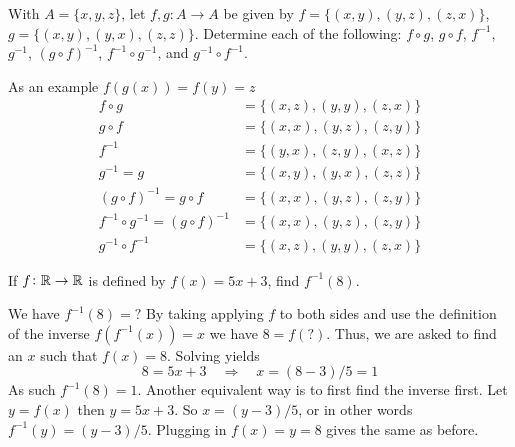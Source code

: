 \documentclass[a4paper, english, 12pt]{article} %
\begin{document}
\newpageanswer

\begin{problem}[27]
  With $A = \{x, y, z\}$, let $f, g \colon A \to A$ be given by $f = \{(x,y),
  (y,z), (z,x)\}$, $g = \{(x, y), (y, x), (z, z)\}$. Determine each of the
  following: $f \circ g$, $g \circ f$, $f^{-1}$, $g^{-1}$, $(g \circ f)^{-1}$,
  $f^{-1}\circ g^{-1}$, and $g^{-1} \circ f^{-1}$.
\end{problem}

\begin{answer}
  As an example $f(g(x)) = f(y) = z$
  \begin{align*}
    f \circ g & = \{ (x,z), (y, y), (z, x) \} \\
    g \circ f & = \{ (x,x), (y,z), (z,y) \} \\
    f^{-1} & = \{(y,x), (z,y), (x,z)\} \\
    g^{-1} = g & = \{(x,y), (y,x), (z,z)\} \\
    (g \circ f)^{-1}  = g \circ f & = \{ (x,x), (y,z), (z,y)\} \\
    f^{-1} \circ g^{-1} = (g \circ f)^{-1} & = \{ (x,x), (y,z), (z, y)\} \\
    g^{-1} \circ f^{-1} & = \{  (x,z), (y,y), (z,x) \} 
  \end{align*}
\end{answer}

\begin{problem}
  \begin{subproblem}
    If $f \colon \mathbb{R} \to \mathbb{R}$ is defined by $f(x) = 5x + 3$, find $f^{-1}(8)$. 
  \end{subproblem}
\end{problem}

\begin{answer}
  We have $f^{-1}(8) = ?$ By taking applying $f$ to both sides and use the
  definition of the inverse $f(f^{-1}(x)) = x$ we have $8 = f(?)$. Thus, we are
  asked to find an $x$ such that $f(x) = 8$. Solving yields
  \begin{equation*}
    8 = 5x + 3 \quad \Rightarrow \quad x = (8 - 3)/5 = 1
  \end{equation*}
  As such $f^{-1}(8) = 1$. Another equivalent way is to first find the inverse
  first. Let $y = f(x)$ then $y = 5x + 3$. So $x = (y - 3)/5$, or in other words
  $f^{-1}(y) = (y - 3)/5$. Plugging in $f(x) = y = 8$ gives the same as before.
\end{answer}



\end{document}
